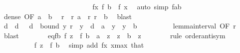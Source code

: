 \begin{isabellebody}
\isanewline
\ \ \ \ \ \ \isamarkupfalse%
\ {}\isanewline
\ \ \ \ \ \ \ \ %
\isanewline
\ \ \ \ \ \ \isamarkupfalse%
\ \isamarkupfalse%
\ fx{\isacharprime}{\kern0pt}{\isacharcolon}{\kern0pt}\ {\isachardoublequoteopen}f\ b\ {\isacharequal}{\kern0pt}\ f\ x{\isacharprime}{\kern0pt}{\isachardoublequoteclose}\ \isamarkupfalse%
\ {\isacharparenleft}{\kern0pt}auto\ simp{\isacharcolon}{\kern0pt}\ fab{\isacharparenright}{\kern0pt}\isanewline
\ \ \ \ \ \ \isamarkupfalse%
\ dense\ {\isacharbrackleft}{\kern0pt}OF\ {\isacartoucheopen}a\ {\isacharless}{\kern0pt}\ b{\isacartoucheclose}{\isacharbrackright}{\kern0pt}\ \isamarkupfalse%
\ r\ \ r{\isacharcolon}{\kern0pt}\ {\isachardoublequoteopen}a\ {\isacharless}{\kern0pt}\ r{\isachardoublequoteclose}\ {\isachardoublequoteopen}r\ {\isacharless}{\kern0pt}\ b{\isachardoublequoteclose}\ \isamarkupfalse%
\ blast\isanewline
\ \ \ \ \ \ \isamarkupfalse%
\ d\ \ d{\isacharcolon}{\kern0pt}\ {\isachardoublequoteopen}{}\ {\isacharless}{\kern0pt}\ d{\isachardoublequoteclose}\ \ bound{\isacharcolon}{\kern0pt}\ {\isachardoublequoteopen}{\isasymforall}y{\isachardot}{\kern0pt}\ {\isasymbar}r\ {\isacharminus}{\kern0pt}\ y{\isasymbar}\ {\isacharless}{\kern0pt}\ d\ {\isasymlongrightarrow}\ a\ {\isasymle}\ y\ {\isasymand}\ y\ {\isasymle}\ b{\isachardoublequoteclose}\isanewline
\ \ \ \ \ \ \ \ \isamarkupfalse%
\ lemma{\isacharunderscore}{\kern0pt}interval\ {\isacharbrackleft}{\kern0pt}OF\ r{\isacharbrackright}{\kern0pt}\ \isamarkupfalse%
\ blast\isanewline
\ \ \ \ \ \ \isamarkupfalse%
\ eq{\isacharunderscore}{\kern0pt}fb{\isacharcolon}{\kern0pt}\ {\isachardoublequoteopen}f\ z\ {\isacharequal}{\kern0pt}\ f\ b{\isachardoublequoteclose}\ \ {\isachardoublequoteopen}a\ {\isasymle}\ z{\isachardoublequoteclose}\ \ {\isachardoublequoteopen}z\ {\isasymle}\ b{\isachardoublequoteclose}\ \ z\isanewline
\ \ \ \ \ \ \isamarkupfalse%
\ {\isacharparenleft}{\kern0pt}rule\ order{\isacharunderscore}{\kern0pt}antisym{\isacharparenright}{\kern0pt}\isanewline
\ \ \ \ \ \ \ \ \isamarkupfalse%
\ {\isachardoublequoteopen}f\ z\ {\isasymle}\ f\ b{\isachardoublequoteclose}\ \isamarkupfalse%
\ {\isacharparenleft}{\kern0pt}simp\ add{\isacharcolon}{\kern0pt}\ fx\ x{\isacharunderscore}{\kern0pt}max\ that{\isacharparenright}{\kern0pt}\isanewline

\end{isabellebody}
